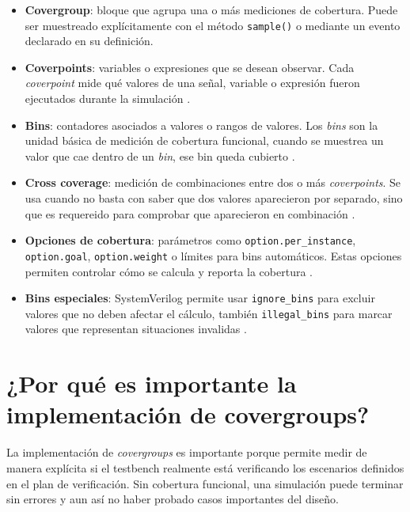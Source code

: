 ﻿\documentclass[conference]{IEEEtran}
\begin{document}
\begin{itemize}
    \item \textbf{Covergroup}: bloque que agrupa una o más mediciones de
    cobertura. Puede ser muestreado explícitamente con el método
    \texttt{sample()} o mediante un evento declarado en su definición.

    \item \textbf{Coverpoints}: variables o expresiones que se desean observar.
    Cada \textit{coverpoint} mide qué valores de una señal, variable o expresión
    fueron ejecutados durante la simulación \cite{Spear2008}.

    \item \textbf{Bins}: contadores asociados a valores o rangos de valores.
    Los \textit{bins} son la unidad básica de medición de cobertura funcional,
    cuando se muestrea un valor que cae dentro de un \textit{bin}, ese bin queda
    cubierto \cite{Spear2008}.

    \item \textbf{Cross coverage}: medición de combinaciones entre dos o más
    \textit{coverpoints}. Se usa cuando no basta con saber que dos valores
    aparecieron por separado, sino que es requereido para comprobar que aparecieron en
    combinación \cite{Spear2008}.

    \item \textbf{Opciones de cobertura}: parámetros como
    \texttt{option.per\_instance}, \texttt{option.goal},
    \texttt{option.weight} o límites para bins automáticos. Estas opciones
    permiten controlar cómo se calcula y reporta la cobertura \cite{Spear2008}.

    \item \textbf{Bins especiales}: SystemVerilog permite usar
    \texttt{ignore\_bins} para excluir valores que no deben afectar el cálculo,
    también \texttt{illegal\_bins} para marcar valores que representan situaciones
    invalidas \cite{Spear2008}.
\end{itemize}

\section{¿Por qué es importante la implementación de covergroups?}

La implementación de \textit{covergroups} es importante porque permite medir
de manera explícita si el testbench realmente está verificando los escenarios
definidos en el plan de verificación. Sin cobertura funcional, una simulación
puede terminar sin errores y aun así no haber probado casos importantes del
diseño.
\end{document}
